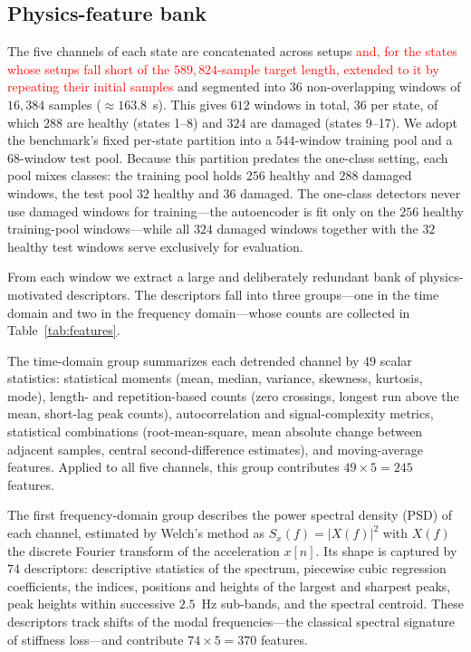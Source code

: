 \documentclass[11pt,a4paper]{article}
\begin{document}
\subsection{Physics-feature bank}
\label{sec:features}
The five channels of each state are concatenated across setups
\textcolor{red}{and, for the states whose setups fall short of the
$589{,}824$-sample target length, extended to it by repeating their initial
samples} and segmented into $36$ non-overlapping windows of
$16{,}384$ samples ($\approx163.8$~s). This gives $612$ windows in total,
$36$ per state, of which $288$ are healthy (states 1--8) and $324$ are damaged
(states 9--17). We adopt the benchmark's fixed per-state partition into a
$544$-window training pool and a $68$-window test pool. Because this partition
predates the one-class setting, each pool mixes classes: the training pool holds
$256$ healthy and $288$ damaged windows, the test pool $32$ healthy and $36$
damaged. The one-class detectors never use damaged windows for training---the
autoencoder is fit only on the $256$ healthy training-pool windows---while all
$324$ damaged windows together with the $32$ healthy test windows serve
exclusively for evaluation.

From each window we extract a large and deliberately redundant bank of
physics-motivated descriptors. The descriptors fall into three groups---one in
the time domain and two in the frequency domain---whose counts are collected in
Table~\ref{tab:features}.

The time-domain group summarizes each detrended channel by $49$ scalar
statistics: statistical moments (mean, median, variance, skewness, kurtosis, mode),
length- and repetition-based counts (zero crossings, longest run above the
mean, short-lag peak counts), autocorrelation and signal-complexity metrics,
statistical combinations (root-mean-square, mean absolute change between
adjacent samples, central second-difference estimates), and moving-average
features. Applied to all five channels, this group contributes $49\times5=245$
features.

The first frequency-domain group describes the power spectral density (PSD) of
each channel, estimated by Welch's method as $S_x(f)=|X(f)|^2$ with $X(f)$ the
discrete Fourier transform of the acceleration $x[n]$. Its shape is captured by
$74$ descriptors: descriptive statistics of the spectrum, piecewise cubic
regression coefficients, the indices, positions and heights of the largest and
sharpest peaks, peak heights within successive $2.5$~Hz sub-bands, and the
spectral centroid. These descriptors track shifts of the modal
frequencies---the classical spectral signature of stiffness loss---and
contribute $74\times5=370$ features.
\end{document}
